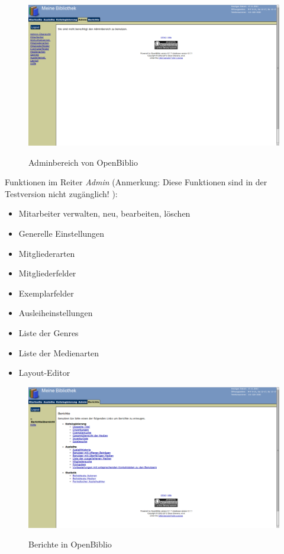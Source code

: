 \documentclass[fontsize=12pt,paper=a4,twoside]{scrartcl}
\begin{document}
\newpage
\begin{figure}[h]
\caption{Adminbereich von OpenBiblio}
\includegraphics[width=1\textwidth]{OpenBiblio/reiter_admin.png}
  \label{admin-openbiblio}
\end{figure}
Funktionen im Reiter \emph{Admin} (Anmerkung: Diese Funktionen sind in der Testversion
nicht zugänglich! ):\\
\begin{itemize}
	\item Mitarbeiter verwalten, neu, bearbeiten, löschen
	\item Generelle Einstellungen
	\item Mitgliederarten
	\item Mitgliederfelder
	\item Exemplarfelder
	\item Ausleiheinstellungen
	\item Liste der Genres
	\item Liste der Medienarten
	\item Layout-Editor
\end{itemize}
\newpage
\begin{figure}[h]
\caption{Berichte in OpenBiblio}
\includegraphics[width=1\textwidth]{OpenBiblio/reiter_berichte.png}
  \label{berichte-openbiblio}
\end{figure}
\end{document}
